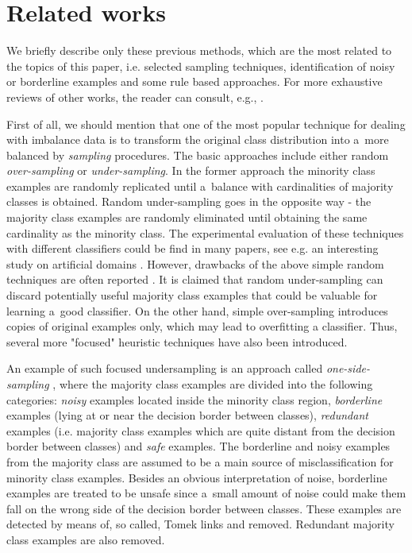\documentclass{AIMeth05}
\begin{document}
\section{Related works}
\label{relatedworks}

We briefly describe only these previous methods, which are the most related
to the topics of this paper,  i.e. selected sampling techniques,
identification of noisy or borderline examples and some rule based
approaches. For more exhaustive reviews of other works, the reader can
consult, e.g., \cite{Gary}.

First of all, we should mention that one of the most popular technique for
dealing with imbalance data is to transform the original class distribution
into a~more balanced by {\em sampling} procedures. The basic approaches
include either random {\em over-sampling} or {\em under-sampling}. In the
former approach the minority class examples are randomly replicated until
a~balance with cardinalities of majority classes is obtained. Random
under-sampling goes in the opposite way - the majority class examples are
randomly eliminated until obtaining the same cardinality as the minority
class. The experimental evaluation of these techniques with different
classifiers could be find in many papers, see e.g. an interesting study on
artificial domains \cite{jap}.  However, drawbacks of the above simple
random techniques are often reported \cite{Batista,Smote,KubMat,Gary}. It is
claimed that random under-sampling can discard potentially useful majority
class examples that could be valuable for learning a~good classifier. On the
other hand, simple over-sampling introduces copies of original examples
only, which may lead to overfitting a classifier. Thus, several more
"focused" heuristic techniques have also been introduced.


An example of such focused undersampling  is an approach called {\em
one-side-sampling} \cite{KubMat},  where the majority class examples are
divided into the following categories: {\em noisy} examples located inside
the minority class region, {\em borderline} examples (lying at or near the
decision border between classes), {\em redundant} examples (i.e. majority
class examples which are quite distant from the decision border between
classes) and {\em safe} examples. The borderline and noisy examples from the
majority class are assumed to be a main source of misclassification for
minority class examples. Besides an obvious interpretation of noise,
borderline examples are treated to be unsafe since a~small amount of noise
could make them fall on the wrong side of the decision border between
classes. These examples are detected by means of, so called, Tomek links
\cite{KubMat} and removed. Redundant majority class examples are also
removed.
\end{document}
